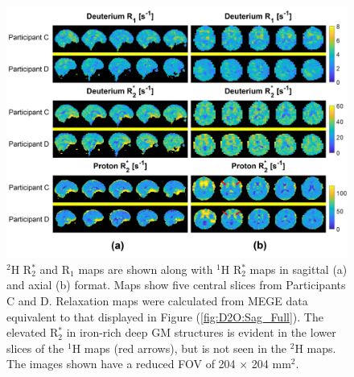 \documentclass[class=article, crop=false]{standalone}
\begin{document}
\begin{figure}
    \centering
    \includegraphics[width=1\textwidth]{Figures/D2O/R1_R2.png}
    \caption{$^2$H R$_2^*$ and R$_1$ maps are shown along with $^1$H R$_2^*$ maps in sagittal (a) and axial (b) format. Maps show five central slices from Participants C and D. Relaxation maps were calculated from MEGE data equivalent to that displayed in Figure (\ref{fig:D2O:Sag_Full}). The elevated R$_2^*$ in iron-rich deep GM structures is evident in the lower slices of the $^1$H maps (red arrows), but is not seen in the $^2$H maps. The images shown have a reduced FOV of 204 × 204 mm$^2$.}
    \label{fig:D2O:R1_R2}
\end{figure}

\end{document}
